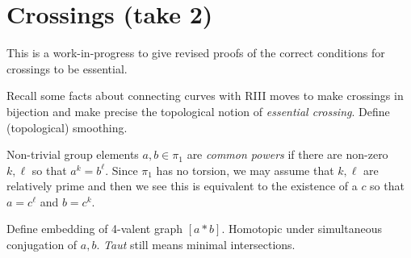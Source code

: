 
\section{Crossings (take 2)}

This is a work-in-progress to give revised proofs of the correct
conditions for crossings to be essential.

\begin{definition}
  Recall some facts about connecting curves with RIII moves to make
  crossings in bijection and make precise the topological notion of
  \emph{essential crossing}. Define (topological) smoothing.
\end{definition}

\begin{definition}
  Non-trivial group elements $a,b\in \pi_1$ are \emph{common powers}
  if there are non-zero $k,\ell$ so that $a^k = b^\ell$. Since $\pi_1$
  has no torsion, we may assume that $k,\ell$ are relatively prime and
  then we see this is equivalent to the existence of a $c$ so that
  $a = c^\ell$ and $b = c^k$.
\end{definition}

Define embedding of 4-valent graph $[a * b]$. Homotopic under
simultaneous conjugation of $a,b$. \emph{Taut} still means minimal
intersections.

